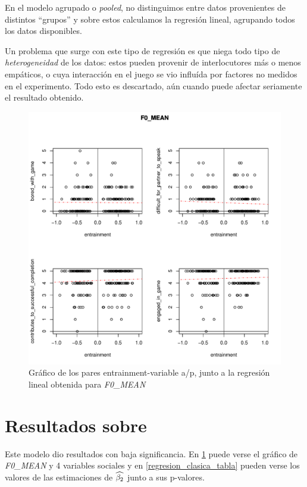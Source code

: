 En el modelo agrupado o \emph{pooled}, no distinguimos entre datos provenientes de distintos ``grupos'' \cite{gujarati1999} y sobre estos calculamos la regresión lineal, agrupando todos los datos disponibles.

Un problema que surge con este tipo de regresión es que niega todo tipo de \emph{heterogeneidad} de los datos: estos pueden provenir de interlocutores más o menos empáticos, o cuya interacción en el juego se vio influída por factores no medidos en el experimento. Todo esto es descartado, aún cuando puede afectar seriamente  el resultado obtenido.


\begin{figure}[b!]
\includegraphics[width=15cm]{images/regression_F0_MEAN_1.pdf}
\caption{Gráfico de los pares entrainment-variable a/p, junto a la regresión lineal obtenida \label{regresion_clasica} para \emph{F0\_MEAN}}
\end{figure}

\section{Resultados sobre \entrainment}

Este modelo dio resultados con baja significancia. En \ref{regresion_clasica} puede verse el gráfico de \emph{F0\_MEAN} y 4 variables sociales y en \ref{regresion_clasica_tabla} pueden verse los valores de las estimaciones de $\widehat{\beta_2}$ junto a sus p-valores.

